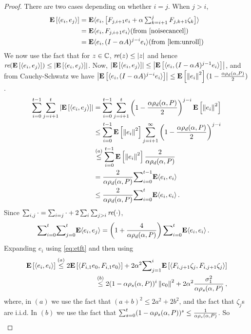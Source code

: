\begin{proof}
There are two cases depending on whether $i=j$. When $j> i$,
\begin{align*}
\EE{\ip{e_i,e_j}}
&=\E \ip{e_i,\big[F_{j,i+1} e_i+\alpha\textstyle\sum_{k=i+1}^j F_{j,k+1}\zeta_{k}\big]}\\
&=\E\ip{e_i,F_{j,i+1} e_i}  \text{(from \Cref{noisecancel})}\\
&=\E\ip{e_i, (I-\alpha A)^{j-i} e_i} \text{(from \Cref{lem:unroll})}
\end{align*}
We now use the fact that for $z\in \mathbb{C}$, $\emph{re}(z)\leq \left|z\right|$ and hence $\emph{re}(\mathbf{E}\left[\langle e_i,e_j\rangle\right])\leq \left|\mathbf{E}\left[\langle e_i,e_j\rangle\right]\right|$. Now,  $\left|\mathbf{E}\left[\langle e_i,e_j\rangle\right]\right|\leq \left|\mathbf{E}\left[\langle e_i,(I-\alpha A)^{j-1}e_i\rangle\right]\right|$, and from Cauchy-Schwatz we have $\left|\mathbf{E}\left[\langle e_i, (I-\alpha A)^{j-i}e_i\rangle\right]\right|\leq \mathbf{E}\left[\left\| e_i\right\|^2\right](1-\frac{\alpha\rho_d(\alpha,P)}{2})$.
\begin{align*}
\label{inter}
\sum_{i=0}^{t-1}\sum_{j=i+1}^t \left|\mathbf{E}\left[\langle e_i,e_j\rangle\right]\right|
&=\sum_{i=0}^{t-1}\sum_{j=i+1}^t \left(1-\frac{\alpha\rho_d(\alpha,P)}{2}\right)^{j-i} \mathbf{E}\left[\left\| e_i\right\|^2\right]\\
&\leq \sum_{i=0}^{t-1} \mathbf{E}\left[\left\| e_i\right\|^2\right] \sum_{j=i+1}^\infty \left(1-\frac{\alpha\rho_d(\alpha,P)}{2}\right)^{j-i} \\
&\stackrel{(a)}{\leq} \sum_{i=0}^{t-1} \mathbf{E}\left[\left\| e_i\right\|^2\right] \frac{2}{\alpha \rho_d(\alpha,P)}\\
&=\frac2{\alpha\rho_d(\alpha,P)} {\sum}_{i=0}^{t-1}\mathbf{E}\langle e_i,e_i\rangle\\
&\leq \frac2{\alpha\rho_d(\alpha,P)}{\sum}_{i=0}^{t}\mathbf{E}\langle e_i,e_i\rangle\,.
\end{align*}
Since $\sum_{i,j}\cdot{} = \sum_{i=j}\cdot{} + 2 \sum_i \sum_{j>i} \emph{re}(\cdot){}$,
\begin{align*}
{\sum}_{i=0}^{t}{\sum}_{j=0}^{t} \mathbf{E}\langle e_i,e_j\rangle&= \left(1+\frac4{\alpha\rho_d(\alpha,P)}\right){\sum}_{i=0}^{t}\mathbf{E}\langle e_i,e_i\rangle\,.
\end{align*}
Expanding $e_i$ using \eqref{eq:etft} and then using 
\begin{align*}
\mathbf{E}\left[\langle e_i,e_i\rangle\right]\stackrel{(a)}{\leq} 2 \mathbf{E}\left[\langle F_{i,1}e_0,F_{i,1}e_0\rangle\right]+2 \alpha^2{\sum}_{j=1}^i\mathbf{E}\left[\langle F_{i,j+1}\zeta_j, F_{i,j+1}\zeta_j\rangle\right]\\
\stackrel{(b)}{\leq} 2 (1-\alpha\rho_s(\alpha,P))^i\left\| e_0\right\|^2+ 2 \alpha^2\frac{{\sigma}_1^2}{\alpha \rho_s(\alpha,P)}\,,
\end{align*}
where, in  $(a)$ we use the fact that $(a+b)^2\leq 2 a^2+2 b^2$, and the fact that $\zeta_j$s are i.i.d. In $(b)$ we use the fact that $\sum_{s=0}^{t} (1-\alpha \rho_s(\alpha,P))^s\leq \frac{1}{\alpha \rho_s(\alpha,P)}$. So
\begin{align*}

\end{align*}
\end{proof}
